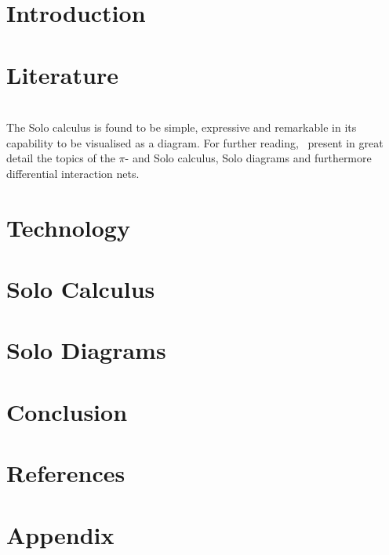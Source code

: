 \documentclass{article}
\begin{document}
    \tableofcontents
    \pagebreak


    \section{Introduction}

    \section{Literature}
        
        
        ~\\ %
        The Solo calculus is found to be simple, expressive and remarkable in its capability to be visualised as a diagram.
        For further reading,~\cite{acyclic-solos} present in great detail the topics of the $\pi$- and Solo calculus, Solo diagrams and furthermore differential interaction nets.


    \section{Technology}

    \section{Solo Calculus}
        

    \section{Solo Diagrams}
        
        
        

    \section{Conclusion}

    \section{References}
        

    \section{Appendix}
        
\end{document}
